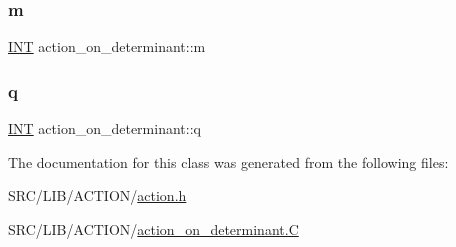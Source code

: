 \subsubsection{\texorpdfstring{m}{m}}
{\footnotesize\ttfamily \mbox{\hyperlink{galois_8h_a09fddde158a3a20bd2dcadb609de11dc}{I\+NT}} action\+\_\+on\+\_\+determinant\+::m}

\mbox{\label{classaction__on__determinant_a9ba25085a9461e3173aeac46e50a6f76}} 
\subsubsection{\texorpdfstring{q}{q}}
{\footnotesize\ttfamily \mbox{\hyperlink{galois_8h_a09fddde158a3a20bd2dcadb609de11dc}{I\+NT}} action\+\_\+on\+\_\+determinant\+::q}



The documentation for this class was generated from the following files\+:\begin{DoxyCompactItemize}
\item 
S\+R\+C/\+L\+I\+B/\+A\+C\+T\+I\+O\+N/\mbox{\hyperlink{action_8h}{action.\+h}}\item 
S\+R\+C/\+L\+I\+B/\+A\+C\+T\+I\+O\+N/\mbox{\hyperlink{action__on__determinant_8_c}{action\+\_\+on\+\_\+determinant.\+C}}\end{DoxyCompactItemize}
